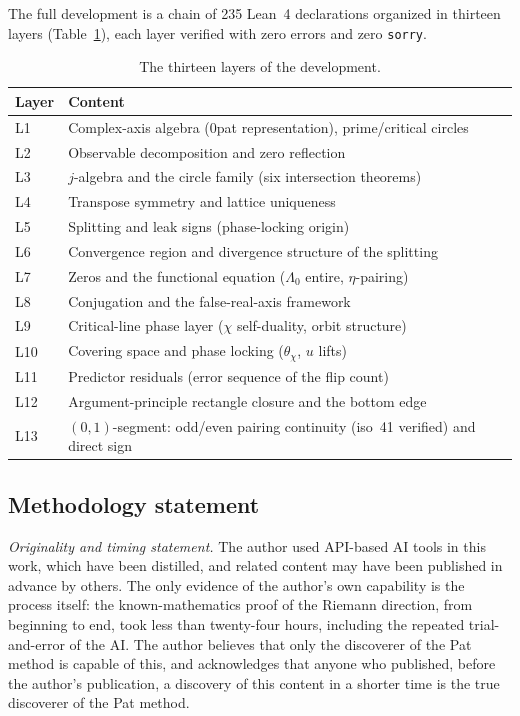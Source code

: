 \documentclass{article}
\newcommand{\Lam}{\Lambda}
\newcommand{\Xchi}{\chi}
\begin{document}
The full development is a chain of 235 Lean~4 declarations organized in
thirteen layers (Table~\ref{tab:layers}), each layer verified with zero
errors and zero \texttt{sorry}.

\begin{table}[h]
\centering
\caption{The thirteen layers of the development.}
\label{tab:layers}
\begin{tabular}{ll}
\hline
Layer & Content \\
\hline
L1 & Complex-axis algebra (0pat representation), prime/critical circles \\
L2 & Observable decomposition and zero reflection \\
L3 & $j$-algebra and the circle family (six intersection theorems) \\
L4 & Transpose symmetry and lattice uniqueness \\
L5 & Splitting and leak signs (phase-locking origin) \\
L6 & Convergence region and divergence structure of the splitting \\
L7 & Zeros and the functional equation ($\Lam_0$ entire, $\eta$-pairing) \\
L8 & Conjugation and the false-real-axis framework \\
L9 & Critical-line phase layer ($\Xchi$ self-duality, orbit structure) \\
L10 & Covering space and phase locking ($\theta_\Xchi$, $u$ lifts) \\
L11 & Predictor residuals (error sequence of the flip count) \\
L12 & Argument-principle rectangle closure and the bottom edge \\
L13 & $(0,1)$-segment: odd/even pairing continuity (iso~41 verified) and direct sign \\
\hline
\end{tabular}
\end{table}

\subsection{Methodology statement}
\label{sec:methodology}

\emph{Originality and timing statement.} The author used API-based AI
tools in this work, which have been distilled, and related content may
have been published in advance by others. The only evidence of the
author's own capability is the process itself: the known-mathematics
proof of the Riemann direction, from beginning to end, took less than
twenty-four hours, including the repeated trial-and-error of the AI.
The author believes that only the discoverer of the Pat method is
capable of this, and acknowledges that anyone who published, before the
author's publication, a discovery of this content in a shorter time is
the true discoverer of the Pat method.
\end{document}
